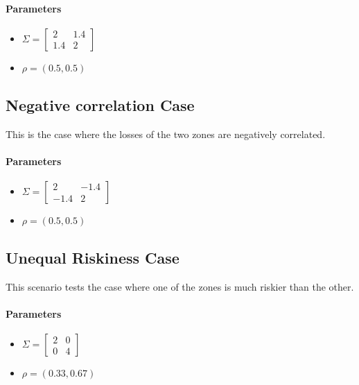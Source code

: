 \documentclass[11pt]{article}
\begin{document}
    \paragraph*{Parameters}
    \begin{itemize}
        \item $\Sigma = \begin{bmatrix}
            2 & 1.4 \\
            1.4 & 2 
            \end{bmatrix} $
        \item $\rho = (0.5,0.5)$
    \end{itemize}

    \subsection*{Negative correlation Case}
    This is the case where the losses of the two zones are negatively correlated. 
    \paragraph*{Parameters}
    \begin{itemize}
        \item $\Sigma = \begin{bmatrix}
            2 & -1.4 \\
            -1.4 & 2 
            \end{bmatrix} $
        \item $\rho = (0.5,0.5)$
    \end{itemize}

    \subsection*{Unequal Riskiness Case}
    This scenario tests the case where one of the zones is much riskier than the other. 
    \paragraph*{Parameters}
    \begin{itemize}
        \item $\Sigma = \begin{bmatrix}
            2 & 0 \\
            0 & 4 
            \end{bmatrix} $
        \item $\rho = (0.33,0.67)$
    \end{itemize}
\end{document}
